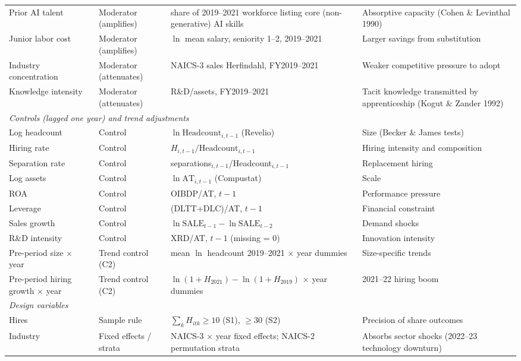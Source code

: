 \begin{longtable}{p{2.3cm}p{1.35cm}p{6.3cm}p{5.2cm}}
Prior AI talent & Moderator (amplifies) & share of 2019--2021 workforce listing core (non-generative) AI skills & Absorptive capacity (Cohen \& Levinthal 1990) \\
Junior labor cost & Moderator (amplifies) & $\ln$ mean salary, seniority 1--2, 2019--2021 & Larger savings from substitution \\
Industry concentration & Moderator (attenuates) & NAICS-3 sales Herfindahl, FY2019--2021 & Weaker competitive pressure to adopt \\
Knowledge intensity & Moderator (attenuates) & R\&D/assets, FY2019--2021 & Tacit knowledge transmitted by apprenticeship (Kogut \& Zander 1992) \\
\midrule
\multicolumn{4}{l}{\textit{Controls (lagged one year) and trend adjustments}}\\
Log headcount & Control & $\ln \text{Headcount}_{i,t-1}$ (Revelio) & Size (Becker \& James tests) \\
Hiring rate & Control & $H_{i,t-1}/\text{Headcount}_{i,t-1}$ & Hiring intensity and composition \\
Separation rate & Control & separations$_{i,t-1}$/Headcount$_{i,t-1}$ & Replacement hiring \\
Log assets & Control & $\ln \text{AT}_{i,t-1}$ (Compustat) & Scale \\
ROA & Control & OIBDP/AT, $t-1$ & Performance pressure \\
Leverage & Control & (DLTT+DLC)/AT, $t-1$ & Financial constraint \\
Sales growth & Control & $\ln \text{SALE}_{t-1}-\ln \text{SALE}_{t-2}$ & Demand shocks \\
R\&D intensity & Control & XRD/AT, $t-1$ (missing = 0) & Innovation intensity \\
Pre-period size $\times$ year & Trend control (C2) & mean $\ln$ headcount 2019--2021 $\times$ year dummies & Size-specific trends \\
Pre-period hiring growth $\times$ year & Trend control (C2) & $\ln(1+H_{2021})-\ln(1+H_{2019})$ $\times$ year dummies & 2021--22 hiring boom \\
\midrule
\multicolumn{4}{l}{\textit{Design variables}}\\
Hires & Sample rule & $\sum_k H_{itk}\ge 10$ (S1), $\ge 30$ (S2) & Precision of share outcomes \\
Industry & Fixed effects / strata & NAICS-3 $\times$ year fixed effects; NAICS-2 permutation strata & Absorbs sector shocks (2022--23 technology downturn) \\
\end{longtable}
\endgroup
